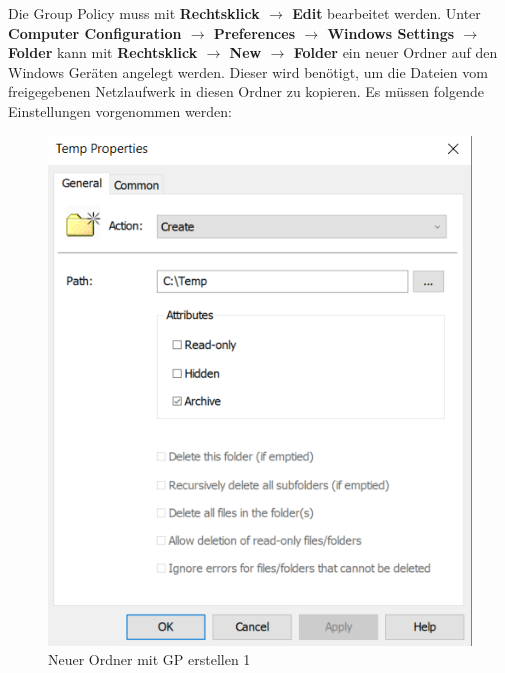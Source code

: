 Die Group Policy muss mit \textbf{Rechtsklick $\rightarrow$ Edit} bearbeitet werden.
Unter \textbf{Computer Configuration $\rightarrow$ Preferences $\rightarrow$ Windows Settings $\rightarrow$ Folder} kann mit \textbf{Rechtsklick $\rightarrow$ New $\rightarrow$ Folder} ein neuer Ordner auf den Windows Geräten angelegt werden.
Dieser wird benötigt, um die Dateien vom freigegebenen Netzlaufwerk in diesen Ordner zu kopieren.
Es müssen folgende Einstellungen vorgenommen werden:\\
\begin{minipage}{0.5\linewidth}
    \begin{figure}[H]
        \centering
        \includegraphics[width=\linewidth]{../img/sysmon/new-folder-1.png}
        \caption{Neuer Ordner mit GP erstellen 1}
    \end{figure}
\end{minipage}
